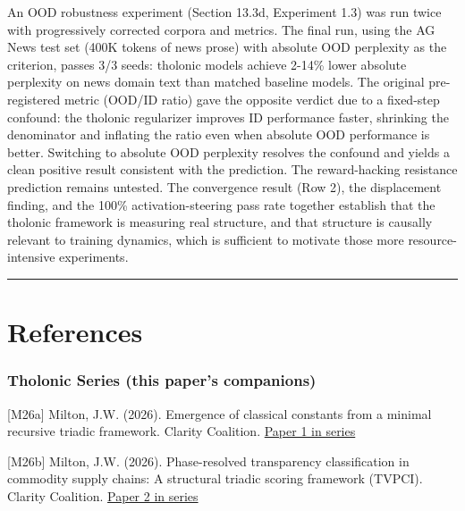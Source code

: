 \documentclass[12pt]{article}
\begin{document}
An OOD robustness experiment (Section 13.3d, Experiment 1.3) was run
twice with progressively corrected corpora and metrics. The final run,
using the AG News test set (400K tokens of news prose) with absolute OOD
perplexity as the criterion, passes 3/3 seeds: tholonic models achieve
2-14\% lower absolute perplexity on news domain text than matched
baseline models. The original pre-registered metric (OOD/ID ratio) gave
the opposite verdict due to a fixed-step confound: the tholonic
regularizer improves ID performance faster, shrinking the denominator
and inflating the ratio even when absolute OOD performance is better.
Switching to absolute OOD perplexity resolves the confound and yields a
clean positive result consistent with the prediction. The reward-hacking
resistance prediction remains untested. The convergence result (Row 2),
the displacement finding, and the 100\% activation-steering pass rate
together establish that the tholonic framework is measuring real
structure, and that structure is causally relevant to training dynamics,
which is sufficient to motivate those more resource-intensive
experiments.

\begin{center}\rule{0.5\linewidth}{0.5pt}\end{center}

\section{References}\label{references}

\subsubsection{Tholonic Series (this paper's
companions)}\label{tholonic-series-this-papers-companions}

{[}M26a{]} Milton, J.W. (2026). Emergence of classical constants from a
minimal recursive triadic framework. Clarity Coalition.
\href{https://github.com/baardev/truevalue/blob/main/docnav/Research/papers/1_recursive-tholonic-five-constants/1_recursive-tholonic-five-constants.pdf}{Paper
1 in series}

{[}M26b{]} Milton, J.W. (2026). Phase-resolved transparency
classification in commodity supply chains: A structural triadic scoring
framework (TVPCI). Clarity Coalition.
\href{https://github.com/baardev/truevalue/blob/main/docnav/Research/papers/2_supply-chain-transparency-tvpci/2_supply-chain-transparency-tvpci.pdf}{Paper
2 in series}
\end{document}
